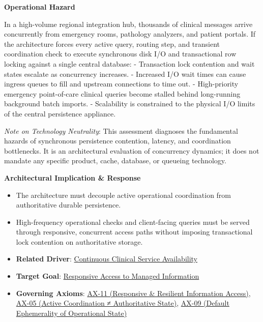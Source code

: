 \par\medskip\textbf{Operational Hazard}\par


In a high-volume regional integration hub, thousands of clinical messages arrive concurrently from emergency rooms, pathology analyzers, and patient portals. If the architecture forces every active query, routing step, and transient coordination check to execute synchronous disk I/O and transactional row locking against a single central database:
- Transaction lock contention and wait states escalate as concurrency increases.
- Increased I/O wait times can cause ingress queues to fill and upstream connections to time out.
- High-priority emergency point-of-care clinical queries become stalled behind long-running background batch imports.
- Scalability is constrained to the physical I/O limits of the central persistence appliance.



\emph{Note on Technology Neutrality}: This assessment diagnoses the fundamental hazards of synchronous persistence contention, latency, and coordination bottlenecks. It is an architectural evaluation of concurrency dynamics; it does not mandate any specific product, cache, database, or queueing technology.



\par\medskip\textbf{Architectural Implication \& Response}\par


\begin{itemize}


\item The architecture must decouple active operational coordination from authoritative durable persistence.

\item High-frequency operational checks and client-facing queries must be served through responsive, concurrent access paths without imposing transactional lock contention on authoritative storage.

\item \textbf{Related Driver}: \href{\detokenize{../../../../../../../../../docs/markdown/01-motivation/drivers-assessments/drivers.md}}{Continuous Clinical Service Availability}

\item \textbf{Target Goal}: \href{\detokenize{../../../../../../../../../docs/markdown/01-motivation/goals-outcomes/strategic-goals.md}}{Responsive Access to Managed Information}

\item \textbf{Governing Axioms}: \hyperref[element:8a1e995f16954484a78ae1c5c114d546]{AX-11 (Responsive \& Resilient Information Access)}, \hyperref[element:0412a2084f0145babc4f022c71fea65f]{AX-05 (Active Coordination ≠ Authoritative State)}, \hyperref[element:9a5cb9e8876844e58e660f909f7df9fc]{AX-09 (Default Ephemerality of Operational State)}

\end{itemize}

